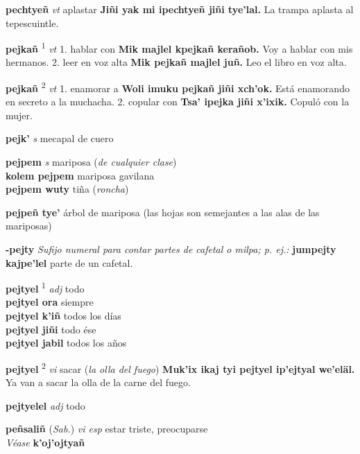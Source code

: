 \documentclass[10pt]{scrbook}
\newcommand{\entry}[1]{\textbf{#1}}
\newcommand{\onedefinition}[1]{#1.}
\newcommand{\defsuperscript}[1]{\textsuperscript{#1}}
\newcommand{\nontranslationdef}[1]{\textit{#1}}
\newcommand{\partofspeech}[1]{\textit{#1}}
\newcommand{\spanishtranslation}[1]{#1}
\newcommand{\clarification}[1]{(\textit{#1})}
\newcommand{\cholexample}[1]{\textbf{#1}}
\newcommand{\exampletranslation}[1]{#1}
\newcommand{\alsosee}[1]{\\\textit{Véase} \textbf{#1}}
\newcommand{\relevantdialect}[1]{(\textit{#1})}
\newcommand{\secondaryentry}[1]{\\\textbf{#1}}
\newcommand{\secondtranslation}[1]{#1}
\begin{document}
\begin{multicols}{2}
\entry{pechtyeñ}
\partofspeech{vt}
\spanishtranslation{aplastar}
\cholexample{Jiñi yak mi ipechtyeñ jiñi tye'lal.}
\exampletranslation{La trampa aplasta al tepescuintle.}

\entry{pejkañ}
\defsuperscript{1}
\partofspeech{vt}
\onedefinition{1}
\spanishtranslation{hablar con}
\cholexample{Mik majlel kpejkañ kerañob.}
\exampletranslation{Voy a hablar con mis hermanos.}
\onedefinition{2}
\spanishtranslation{leer en voz alta}
\cholexample{Mik pejkañ majlel juñ.}
\exampletranslation{Leo el libro en voz alta.}

\entry{pejkañ}
\defsuperscript{2}
\partofspeech{vt}
\onedefinition{1}
\spanishtranslation{enamorar a}
\cholexample{Woli imuku pejkañ jiñi xch'ok.}
\exampletranslation{Está enamorando en secreto a la muchacha.}
\onedefinition{2}
\spanishtranslation{copular con}
\cholexample{Tsa' ipejka jiñi x'ixik.}
\exampletranslation{Copuló con la mujer.}

\entry{pejk'}
\partofspeech{s}
\spanishtranslation{mecapal de cuero}

\entry{pejpem}
\partofspeech{s}
\spanishtranslation{mariposa}
\clarification{de cualquier clase}
\secondaryentry{kolem pejpem}
\secondtranslation{mariposa gavilana}
\secondaryentry{pejpem wuty}
\secondtranslation{tiña}
\clarification{roncha}

\entry{pejpeñ tye'}
\spanishtranslation{árbol de mariposa (las hojas son semejantes a las alas de las mariposas)}

\entry{-pejty}
\nontranslationdef{Sufijo numeral para contar partes de cafetal o milpa; p. ej.:}
\cholexample{jumpejty kajpe'lel}
\exampletranslation{parte de un cafetal.}

\entry{pejtyel}
\defsuperscript{1}
\partofspeech{adj}
\spanishtranslation{todo}
\secondaryentry{pejtyel ora}
\secondtranslation{siempre}
\secondaryentry{pejtyel k'iñ}
\secondtranslation{todos los días}
\secondaryentry{pejtyel jiñi}
\secondtranslation{todo ése}
\secondaryentry{pejtyel jabil}
\secondtranslation{todos los años}

\entry{pejtyel}
\defsuperscript{2}
\partofspeech{vi}
\spanishtranslation{sacar}
\clarification{la olla del fuego}
\cholexample{Muk'ix ikaj tyi pejtyel ip'ejtyal we'eläl.}
\exampletranslation{Ya van a sacar la olla de la carne del fuego.}

\entry{pejtyelel}
\partofspeech{adj}
\spanishtranslation{todo}

\entry{peñsaliñ}
\relevantdialect{Sab.}
\partofspeech{vi esp}
\spanishtranslation{estar triste, preocuparse}
\alsosee{k'oj'ojtyañ}


\end{multicols}
\end{document}
